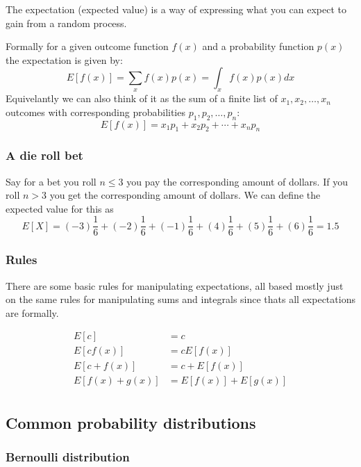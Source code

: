 \documentclass[12pt]{article}
\begin{document}
\begin{definition}[Expectation]
    The expectation (expected value) is a way of expressing what you can expect to gain from a random process.
\end{definition}

Formally for a given outcome function $f(x)$ and a probability function $p(x)$ the expectation is given by:
\[
    E[f(x)] = \sum_{x} f(x)p(x)= \int_{x} f(x)p(x)dx
\] 
Equivelantly we can also think of it as the sum of a finite list of $x_1, x_2, \ldots, x_n$ outcomes with corresponding probabilities $p_1, p_2, \ldots, p_n$:
\[
    E[f(x)] = x_1p_1 + x_2p_2 + \cdots + x_n p_n  
\]

\subsubsection*{A die roll bet}
Say for a bet you roll $n \leq 3$ you pay the corresponding amount of dollars. If you roll $n > 3$ you get the corresponding amount of dollars. We can define the expected value for this as 
\[
    E[X] = (-3)\frac{1}{6} + (-2)\frac{1}{6} + (-1)\frac{1}{6} + (4)\frac{1}{6} + (5)\frac{1}{6} + (6)\frac{1}{6} = 1.5 
\]

\subsubsection*{Rules}

There are some basic rules for manipulating expectations, all based mostly just on the same rules for manipulating sums and integrals since thats all expectations are formally.

\begin{align*}
    E[c] & = c \\ 
    E[cf(x)] & = cE[f(x)] \\
    E[c + f(x)] & = c + E[f(x)] \\ 
    E[f(x) + g(x)] & = E[f(x)] + E[g(x)] \\
\end{align*}

\subsection{Common probability distributions}

\subsubsection*{Bernoulli distribution}
\end{document}
